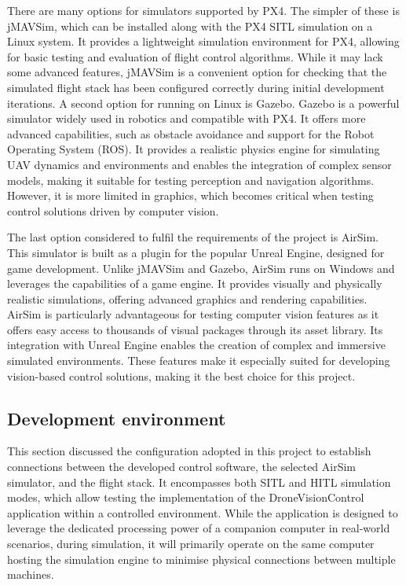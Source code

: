There are many options for simulators supported by PX4.
The simpler of these is jMAVSim, which can be installed along with the PX4 SITL simulation on a Linux system. It provides a lightweight simulation environment for PX4, allowing for basic testing and evaluation of flight control algorithms. While it may lack some advanced features, jMAVSim is a convenient option for checking that the simulated flight stack has been configured correctly during initial development iterations.
A second option for running on Linux is Gazebo. Gazebo is a powerful simulator widely used in robotics and compatible with PX4. It offers more advanced capabilities, such as obstacle avoidance and support for the Robot Operating System (ROS). It provides a realistic physics engine for simulating UAV dynamics and environments and enables the integration of complex sensor models, making it suitable for testing perception and navigation algorithms. However, it is more limited in graphics, which becomes critical when testing control solutions driven by computer vision.

The last option considered to fulfil the requirements of the project is AirSim. This simulator is built as a plugin for the popular Unreal Engine, designed for game development. Unlike jMAVSim and Gazebo, AirSim runs on Windows and leverages the capabilities of a game engine. It provides visually and physically realistic simulations, offering advanced graphics and rendering capabilities. AirSim is particularly advantageous for testing computer vision features as it offers easy access to thousands of visual packages through its asset library. Its integration with Unreal Engine enables the creation of complex and immersive simulated environments. These features make it especially suited for developing vision-based control solutions, making it the best choice for this project.


\subsection{Development environment}

This section discussed the configuration adopted in this project to establish connections between the developed control software, the selected AirSim simulator, and the flight stack. It encompasses both SITL and HITL simulation modes, which allow testing the implementation of the DroneVisionControl application within a controlled environment. While the application is designed to leverage the dedicated processing power of a companion computer in real-world scenarios, during simulation, it will primarily operate on the same computer hosting the simulation engine to minimise physical connections between multiple machines.

